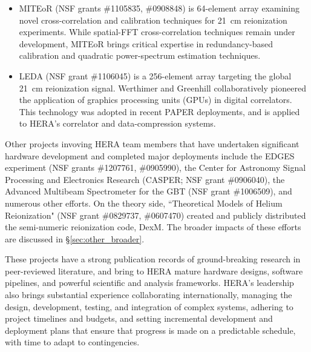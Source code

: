 \documentclass[preprint]{aastex}
\begin{document}
\begin{itemize}[noitemsep,nolistsep]
\item{MITEoR} (NSF grants \#1105835, \#0908848) is 64-element array 
examining novel cross-correlation and calibration techniques for 21~cm reionization experiments.
While spatial-FFT cross-correlation
techniques remain under development, MITEoR brings critical expertise in redundancy-based calibration
and quadratic power-spectrum estimation techniques.

\item{LEDA} (NSF grant \#1106045) is a 256-element array targeting the
global 21~cm reionization signal.  Werthimer and Greenhill collaboratively 
pioneered the application of graphics processing units (GPUs) in digital correlators.
This technology was adopted in recent PAPER deployments, and is applied to HERA's correlator
and data-compression systems.

\end{itemize}

\noindent
Other projects invoving HERA team members that have undertaken significant hardware development and
completed major deployments include the EDGES experiment (NSF grants \#1207761, \#0905990),
the Center for Astronomy Signal Processing and Electronics Research (CASPER; NSF grant \#0906040), the Advanced Multibeam
Spectrometer for the GBT (NSF grant \#1006509), and numerous other efforts.  On the theory side, 
``Theoretical Models of Helium Reionization" (NSF grant \#0829737, \#0607470) 
created and publicly distributed the semi-numeric reionization code, DexM.  The broader impacts of these
efforts are discussed in \S\ref{sec:other_broader}.

These projects have a strong publication records of ground-breaking research in peer-reviewed literature, and
bring to HERA mature hardware designs, software pipelines, and powerful scientific and analysis frameworks.
HERA's leadership also brings substantial experience
collaborating internationally, managing the design, development, testing, and integration of complex systems,
adhering to project timelines and budgets, and setting incremental development and deployment plans that
ensure that progress is made on a predictable schedule, with time to adapt to contingencies.
\end{document}

